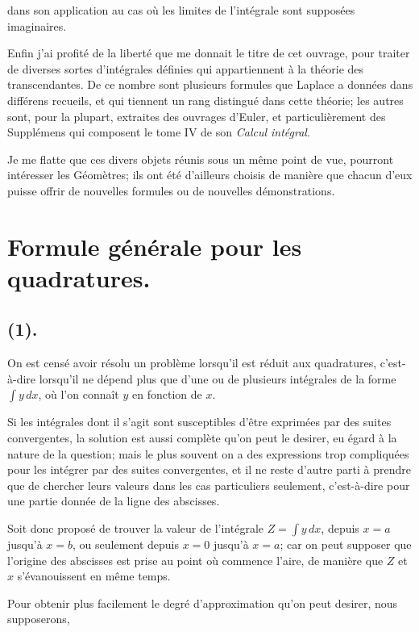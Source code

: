 \documentclass{article}
\begin{document}
dans son application au cas où les limites de l'intégrale sont supposées imaginaires.

Enfin j'ai profité de la liberté que me donnait le titre de cet ouvrage, pour traiter de diverses sortes d'intégrales définies qui appartiennent à la théorie des transcendantes. De ce nombre sont plusieurs formules que Laplace a données dans différens recueils, et qui tiennent un rang distingué dans cette théorie; les autres sont, pour la plupart, extraites des ouvrages d'Euler, et particulièrement des Supplémens qui composent le tome IV de son \emph{Calcul intégral}.

Je me flatte que ces divers objets réunis sous un même point de vue, pourront intéresser les Géomètres; ils ont été d'ailleurs choisis de manière que chacun d'eux puisse offrir de nouvelles formules ou de nouvelles démonstrations.

\section*{Formule générale pour les quadratures.}

\subsection*{(1).}

On est censé avoir résolu un problème lorsqu'il est réduit aux quadratures, c'est-à-dire lorsqu'il ne dépend plus que d'une ou de plusieurs intégrales de la forme $\displaystyle\int y\,dx$, où l'on connaît $y$ en fonction de $x$.

Si les intégrales dont il s'agit sont susceptibles d'être exprimées par des suites convergentes, la solution est aussi complète qu'on peut le desirer, eu égard à la nature de la question; mais le plus souvent on a des expressions trop compliquées pour les intégrer par des suites convergentes, et il ne reste d'autre parti à prendre que de chercher leurs valeurs dans les cas particuliers seulement, c'est-à-dire pour une partie donnée de la ligne des abscisses.

Soit donc proposé de trouver la valeur de l'intégrale $\displaystyle Z=\int y\,dx$, depuis $x=a$ jusqu'à $x=b$, ou seulement depuis $x=0$ jusqu'à $x=a$; car on peut supposer que l'origine des abscisses est prise au point où commence l'aire, de manière que $Z$ et $x$ s'évanouissent en même temps.

Pour obtenir plus facilement le degré d'approximation qu'on peut desirer, nous supposerons,
\end{document}
